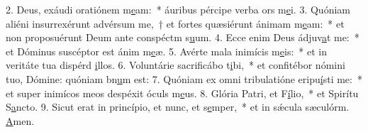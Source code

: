 2. Deus, exáudi oratiónem m\uline{e}am:~* áuribus pércipe verba ors m\uline{e}i.
3. Quóniam aliéni insurrexérunt advérsum me,~† et fortes quæsiérunt ánimam m\uline{e}am:~* et non proposuérunt Deum ante conspéctm s\uline{u}um.
4. Ecce enim Deus ádjuv\uline{a}t me:~* et Dóminus suscéptor est ánim m\uline{e}æ.
5. Avérte mala inimícis m\uline{e}is:~* et in veritáte tua dispérd \uline{i}llos.
6. Voluntárie sacrificábo t\uline{i}bi,~* et confitébor nómini tuo, Dómine: quóniam bn\uline{u}m est:
7. Quóniam ex omni tribulatióne eripu\uline{í}sti me:~* et super inimícos meos despéxit óculs m\uline{e}us.
8. Glória Patri, et F\uline{í}lio,~* et Spirítu S\uline{a}ncto.
9. Sicut erat in princípio, et nunc, et s\uline{e}mper,~* et in sǽcula sæculórm. \uline{A}men.
